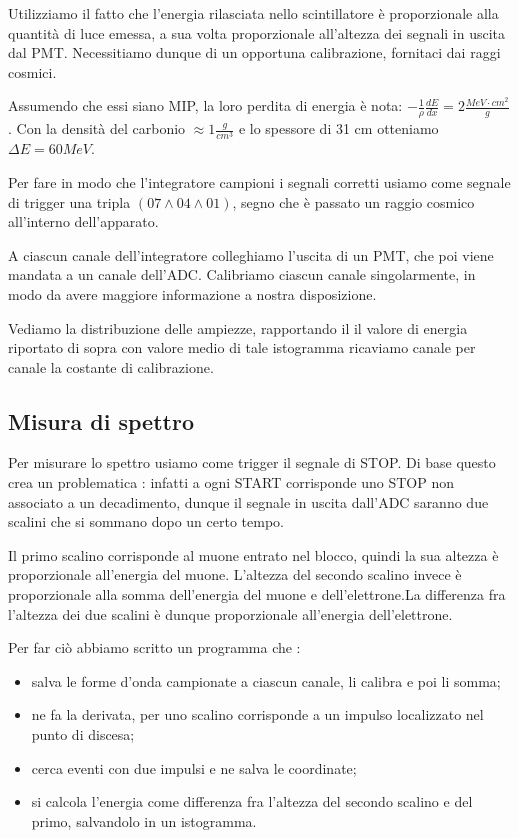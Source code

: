 \documentclass[10pt,a4paper]{article}
\begin{document}
Utilizziamo il fatto che l'energia rilasciata nello scintillatore è proporzionale alla quantità di luce emessa, a sua volta proporzionale all'altezza dei segnali in uscita dal PMT. Necessitiamo dunque di un opportuna calibrazione, fornitaci dai raggi cosmici. 

Assumendo che essi siano MIP, la loro perdita di energia è nota: $-\frac{1}{\rho}\frac{dE}{dx} = 2\frac{MeV \cdot cm^{2}}{g}$. Con la densità del carbonio $\approx 1 \frac{g}{cm^{3}}$ e lo spessore di 31 cm otteniamo $\Delta E  = 60MeV$. 

Per fare in modo che l'integratore campioni i segnali corretti usiamo come segnale di trigger una tripla $(07\land04\land01)$, segno che è passato un raggio cosmico all'interno dell'apparato. 

A ciascun canale dell'integratore colleghiamo l'uscita di un PMT, che poi viene mandata a un canale dell'ADC. Calibriamo ciascun canale singolarmente, in modo da avere maggiore informazione a nostra disposizione. 

Vediamo la distribuzione delle ampiezze, rapportando il il valore di energia riportato di sopra con valore medio di tale istogramma ricaviamo canale per canale la costante di calibrazione. 


\subsection{Misura di spettro}

Per misurare lo spettro usiamo come trigger il segnale di STOP. Di base questo crea un problematica : infatti a ogni START corrisponde uno STOP non associato a un decadimento, dunque il segnale in uscita dall'ADC saranno due scalini che si sommano dopo un certo tempo.

Il primo scalino corrisponde al muone entrato nel blocco, quindi la sua altezza è proporzionale all'energia del muone. L'altezza del secondo scalino invece è proporzionale alla somma dell'energia del muone e dell'elettrone.La differenza fra l'altezza dei due scalini è dunque proporzionale all'energia dell'elettrone. 

Per far ciò abbiamo scritto un programma che :

\begin{itemize}
\item salva le forme d'onda campionate a ciascun canale, li calibra e poi li somma;
\item ne fa la derivata, per uno scalino corrisponde a un impulso localizzato nel punto di discesa;
\item cerca eventi con due impulsi e ne salva le coordinate;
\item si calcola l'energia come differenza fra l'altezza del secondo scalino e del primo, salvandolo in un istogramma.
\end{itemize}

\end{document}
